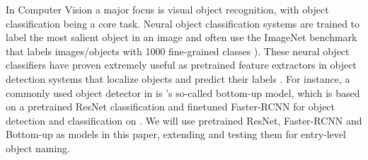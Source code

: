  


In Computer Vision a major focus is visual object recognition, with object classification being a core task. 
Neural object classification systems are trained to label the most salient object in an image and often use the ImageNet \cite{imagenet_cvpr09} benchmark that labels images/objects with 1000 fine-grained classes \cite{googlenet,he2016deep}). 
These neural object classifiers have proven extremely useful %
as pretrained feature extractors in object detection systems that localize objects and predict their labels \cite{fasterrcnn2015}.
For instance, a commonly used object detector in \lv is \citep{anderson2018updown}'s so-called bottom-up model, which is based on a pretrained ResNet classification and finetuned Faster-RCNN \cite{fasterrcnn2015} for object detection and classification on \vg. 
We will use pretrained ResNet, Faster-RCNN and Bottom-up as models in this paper, extending and testing them for entry-level object naming. 


